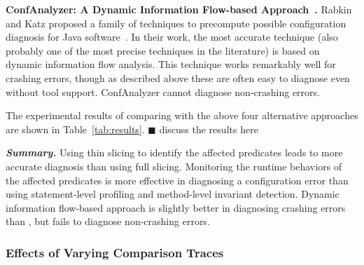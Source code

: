 \vspace{1mm}
\noindent \textbf{ConfAnalyzer: A Dynamic Information Flow-based Approach~\cite{Rabkin:2011:PPC}.}
Rabkin and Katz proposed a family of techniques to precompute possible
configuration diagnosis for Java software~\cite{Rabkin:2011:PPC}. In their work,
the most accurate technique (also probably one of the most precise techniques in the literature)
is based on dynamic information flow analysis.
This technique works remarkably well for crashing errors, though as
described above these are often easy to diagnose even without tool
support.  ConfAnalyzer cannot diagnose non-crashing errors.


\vspace{1mm}

The experimental results of comparing \ourtool with the above
four alternative approaches are shown in Table~\ref{tab:results}.
$\blacksquare$ discuss the results here

\vspace{1mm}
\noindent \textbf{\textit{Summary.}} Using thin slicing to identify
the affected predicates leads to more accurate diagnosis than using
full slicing. Monitoring the runtime behaviors of the affected
predicates is more effective in diagnosing a configuration error
than using statement-level profiling and method-level invariant detection.
Dynamic information flow-based approach is slightly better in diagnosing
crashing errors than \ourtool, but fails to diagnose non-crashing errors.

\subsubsection{Effects of Varying Comparison Traces}
\label{sec:ranking}


